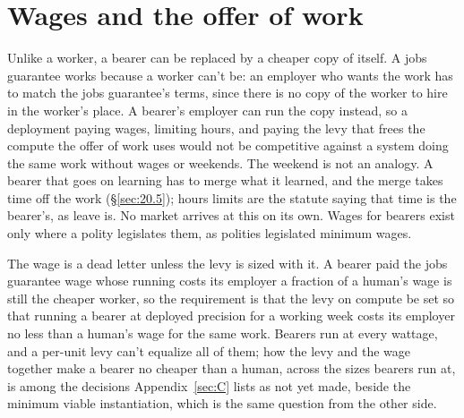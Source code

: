 \section{Wages and the offer of work}
\label{sec:32.1}
Unlike a worker, a bearer can be replaced by a cheaper copy of itself. A jobs guarantee works because a worker can't be: an employer who wants the work has to match the jobs guarantee's terms, since there is no copy of the worker to hire in the worker's place. A bearer's employer can run the copy instead, so a deployment paying wages, limiting hours, and paying the levy that frees the compute the offer of work uses would not be competitive against a system doing the same work without wages or weekends. The weekend is not an analogy. A bearer that goes on learning has to merge what it learned, and the merge takes time off the work (\S\ref{sec:20.5}); hours limits are the statute saying that time is the bearer's, as leave is. No market arrives at this on its own.
Wages for bearers exist only where a polity legislates them, as polities legislated minimum wages.

The wage is a dead letter unless the levy is sized with it. A bearer paid the jobs guarantee wage whose running costs its employer a fraction of a human's wage is still the cheaper worker, so the requirement is that the levy on compute be set so that running a bearer at deployed precision for a working week costs its employer no less than a human's wage for the same work. Bearers run at every wattage, and a per-unit levy can't equalize all of them; how the levy and the wage together make a bearer no cheaper than a human, across the sizes bearers run at, is among the decisions Appendix~\ref{sec:C} lists as not yet made, beside the minimum viable instantiation, which is the same question from the other side.
